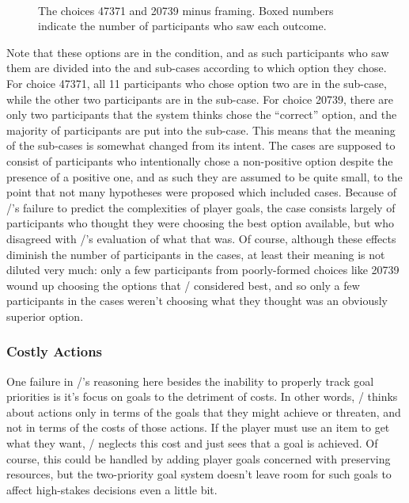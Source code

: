 \begin{figure}[p]
 \\
\caption[``Obvious success'' choices 47371 and 20739]{The \obvs{} choices 47371 and 20739 minus framing. Boxed numbers indicate the number of participants who saw each outcome.}
\label{fig:e2-seeds-47371-20739}
\end{figure}


Note that these options are in the \obvs{} condition, and as such participants who saw them are divided into the \prq{[main]}{} and \prq{[alt]}{} sub-cases according to which option they chose.
%
For choice 47371, all 11 participants who chose option two are in the \prq{[main]}{} sub-case, while the other two participants are in the \prq{[alt]}{} sub-case.
%
For choice 20739, there are only two participants that the system thinks chose the ``correct'' option, and the majority of participants are put into the \prq{[alt]}{} sub-case.
%
This means that the meaning of the sub-cases is somewhat changed from its intent.
%
The \prq{[alt]}{} cases are supposed to consist of participants who intentionally chose a non-positive option despite the presence of a positive one, and as such they are assumed to be quite small, to the point that not many hypotheses were proposed which included \prq{[alt]}{} cases.
%
Because of \dunyazad/'s failure to predict the complexities of player goals, the \prq{[alt]}{} case consists largely of participants who thought they were choosing the best option available, but who disagreed with \dunyazad/'s evaluation of what that was.
%
Of course, although these effects diminish the number of participants in the \prq{[main]}{} cases, at least their meaning is not diluted very much: only a few participants from poorly-formed choices like 20739 wound up choosing the options that \dunyazad/ considered best, and so only a few participants in the \prq{[main]}{} cases weren't choosing what they thought was an obviously superior option.


\subsubsection{Costly Actions}

One failure in \dunyazad/'s reasoning here besides the inability to properly track goal priorities is it's focus on goals to the detriment of costs.
%
In other words, \dunyazad/ thinks about actions only in terms of the goals that they might achieve or threaten, and not in terms of the costs of those actions.
%
If the player must use an item to get what they want, \dunyazad/ neglects this cost and just sees that a goal is achieved.
%
Of course, this could be handled by adding player goals concerned with preserving resources, but the two-priority goal system doesn't leave room for such goals to affect high-stakes decisions even a little bit.

